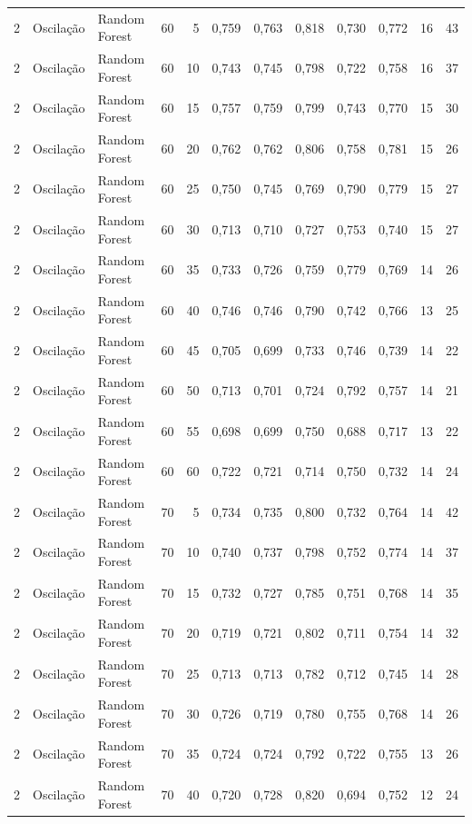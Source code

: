 \begin{longtable}{@{}rllrrrrrrrrr@{}}
2 & Oscilação & Random Forest & 60 & 5 & 0,759 & 0,763 & 0,818 & 0,730 & 0,772 & 16 & 43 \\
2 & Oscilação & Random Forest & 60 & 10 & 0,743 & 0,745 & 0,798 & 0,722 & 0,758 & 16 & 37 \\
2 & Oscilação & Random Forest & 60 & 15 & 0,757 & 0,759 & 0,799 & 0,743 & 0,770 & 15 & 30 \\
2 & Oscilação & Random Forest & 60 & 20 & 0,762 & 0,762 & 0,806 & 0,758 & 0,781 & 15 & 26 \\
2 & Oscilação & Random Forest & 60 & 25 & 0,750 & 0,745 & 0,769 & 0,790 & 0,779 & 15 & 27 \\
2 & Oscilação & Random Forest & 60 & 30 & 0,713 & 0,710 & 0,727 & 0,753 & 0,740 & 15 & 27 \\
2 & Oscilação & Random Forest & 60 & 35 & 0,733 & 0,726 & 0,759 & 0,779 & 0,769 & 14 & 26 \\
2 & Oscilação & Random Forest & 60 & 40 & 0,746 & 0,746 & 0,790 & 0,742 & 0,766 & 13 & 25 \\
2 & Oscilação & Random Forest & 60 & 45 & 0,705 & 0,699 & 0,733 & 0,746 & 0,739 & 14 & 22 \\
2 & Oscilação & Random Forest & 60 & 50 & 0,713 & 0,701 & 0,724 & 0,792 & 0,757 & 14 & 21 \\
2 & Oscilação & Random Forest & 60 & 55 & 0,698 & 0,699 & 0,750 & 0,688 & 0,717 & 13 & 22 \\
2 & Oscilação & Random Forest & 60 & 60 & 0,722 & 0,721 & 0,714 & 0,750 & 0,732 & 14 & 24 \\
2 & Oscilação & Random Forest & 70 & 5 & 0,734 & 0,735 & 0,800 & 0,732 & 0,764 & 14 & 42 \\
2 & Oscilação & Random Forest & 70 & 10 & 0,740 & 0,737 & 0,798 & 0,752 & 0,774 & 14 & 37 \\
2 & Oscilação & Random Forest & 70 & 15 & 0,732 & 0,727 & 0,785 & 0,751 & 0,768 & 14 & 35 \\
2 & Oscilação & Random Forest & 70 & 20 & 0,719 & 0,721 & 0,802 & 0,711 & 0,754 & 14 & 32 \\
2 & Oscilação & Random Forest & 70 & 25 & 0,713 & 0,713 & 0,782 & 0,712 & 0,745 & 14 & 28 \\
2 & Oscilação & Random Forest & 70 & 30 & 0,726 & 0,719 & 0,780 & 0,755 & 0,768 & 14 & 26 \\
2 & Oscilação & Random Forest & 70 & 35 & 0,724 & 0,724 & 0,792 & 0,722 & 0,755 & 13 & 26 \\
2 & Oscilação & Random Forest & 70 & 40 & 0,720 & 0,728 & 0,820 & 0,694 & 0,752 & 12 & 24 \\

\end{longtable}
